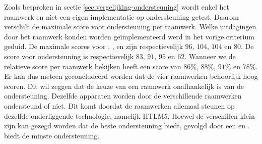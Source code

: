 \begin{table}[H]
\centering
{}
\caption{Ondersteuning per apparaat.}
\label{tabel:evaluatie-ondersteuning-a}
\end{table}

Zoals besproken in sectie \ref{sec:vergelijking-ondersteuning} wordt enkel het raamwerk en niet een eigen implementatie op ondersteuning getest.
Daarom verschilt de maximale score voor ondersteuning per raamwerk.
Welke uitdagingen door het raamwerk konden worden geïmplementeerd werd in het vorige criterium geduid.
De maximale scores voor \st{},  \kendo{},  \jqm{} en \lungo{} zijn respectievelijk $96$, $104$, $104$ en $80$.
De score voor ondersteuning is respectievelijk $83$, $91$, $95$ en $62$.
Wanneer we de relatieve score per raamwerk bekijken heeft \st{} een score van $86\%$,  \kendo{} $88\%$,  \jqm{} $91\%$ en \lungo $78\%$.
Er kan dus meteen geconcludeerd worden dat de vier raamwerken behoorlijk hoog scoren.
Dit wil zeggen dat de keuze van een raamwerk onafhankelijk is van de ondersteuning.
Dezelfde apparaten worden door de verschillende raamwerken ondersteund of niet.
Dit komt doordat de raamwerken allemaal steunen op dezelfde onderliggende technologie, namelijk HTLM5.
Hoewel de verschillen klein zijn kan gezegd worden dat \jqm{} de beste ondersteuning biedt,  gevolgd door een \kendo{} en \st{}.
\lungo{} biedt de minste ondersteuning.

